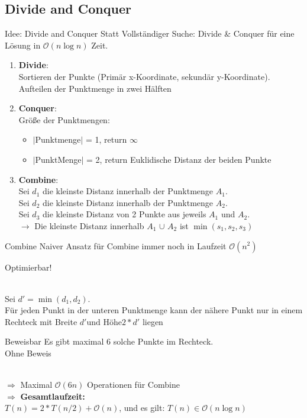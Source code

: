 \documentclass[18pt]{beamer}
\begin{document}
	\subsection{Divide and Conquer}
		\begin{frame}{Idee: Divide and Conquer}
			Statt Vollständiger Suche: Divide \& Conquer für eine Lösung in $\mathcal{O}(n \log n)$ Zeit.

			\begin{enumerate}
				\item \textbf{Divide}:\\ Sortieren der Punkte (Primär x-Koordinate, sekundär y-Koordinate). Aufteilen der Punktmenge in zwei Hälften
				\item \textbf{Conquer}:\\ Größe der Punktmengen:
					\begin{itemize}
						\item $|$Punktmenge$|$ = 1, return $ \infty$
						\item $|$PunktMenge$|$ = 2, return Euklidische Distanz der beiden Punkte
					\end{itemize}
				\item \textbf{Combine}: \\ Sei $d_{1}$ die kleinste Distanz innerhalb der Punktmenge $A_1$. \\
							Sei $d_2$ die kleinste Distanz innerhalb der Punktmenge $A_2$. \\
							Sei $d_{3}$ die kleinste Distanz von 2 Punkte aus jeweils $A_{1}$ und $A_{2}$.\\
							$\rightarrow$ Die kleinste Distanz innerhalb $A_1$ $\cup$ $A_2$ ist $\min(s_1,s_2, s_3)$ \\
			\end{enumerate}
		\end{frame}

		\begin{frame}{Combine}
			Naiver Ansatz für Combine immer noch in Laufzeit $\mathcal{O}(n^2)$ \\
			\centerline{\huge{Optimierbar!}} \\
			Sei $d' = \min(d_1, d_2)$. \\  
			Für jeden Punkt in der unteren Punktmenge kann der nähere Punkt nur in einem Rechteck mit Breite $d' \text{und Höhe} 2*d'$ liegen
			\begin{block}{Beweisbar}
				Es gibt maximal 6 solche Punkte im Rechteck. \\
				Ohne Beweis
			\end{block}
			\ \\
			$\Rightarrow$ Maximal $\mathcal{O}(6n)$ Operationen für Combine \\
			$\Rightarrow$ \textbf{Gesamtlaufzeit:} \\ $T(n) = 2 * T(n/2) + \mathcal{O}(n)$, und es gilt: $T(n) \in \mathcal{O}(n \log n)$
		\end{frame}
	
\end{document}
